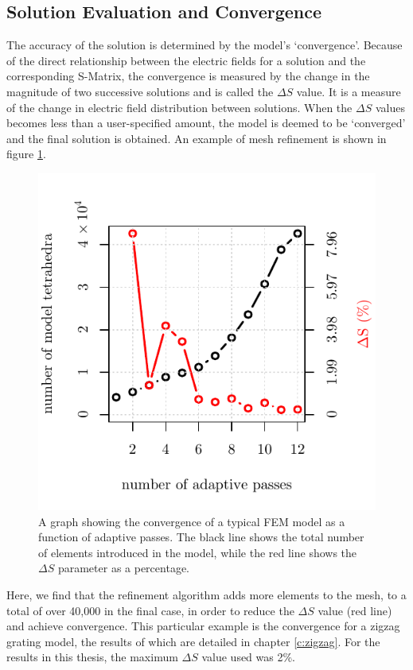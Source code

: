 \subsection{Solution Evaluation and Convergence}

The accuracy of the solution is determined by the model's `convergence'. Because of the direct relationship between the electric fields for a solution and the corresponding S-Matrix,  the convergence is measured by the change in the magnitude of two successive solutions and is called the $\Delta S$ value. It is a measure of the change in electric field distribution between solutions. When the $\Delta S$ values becomes less than a user-specified amount, the model is deemed to be `converged' and the final solution is obtained. An example of mesh refinement is shown in figure \ref{fig:hfssconvergence}. 
\begin{figure}[h]
	\begin{center}
		\includegraphics{figure-convergence.pdf}
		\caption[A graph showing the convergence of a typical FEM model as a function of adaptive passes.]{A graph showing the convergence of a typical FEM model as a function of adaptive passes. The black line shows the total number of elements introduced in the model, while the \color{red} red \color{black}line shows the $\Delta S$ parameter as a percentage.\label{fig:hfssconvergence}}
	\end{center}
\end{figure}
Here, we find that the refinement algorithm adds more elements to the mesh, to a total of over 40,000 in the final case, in order to reduce the $\Delta S$ value (red line) and achieve convergence. This particular example is the convergence for a zigzag grating model, the results of which are detailed in chapter \ref{c:zigzag}. For the results in this thesis, the maximum $\Delta S$ value used was 2\%.


